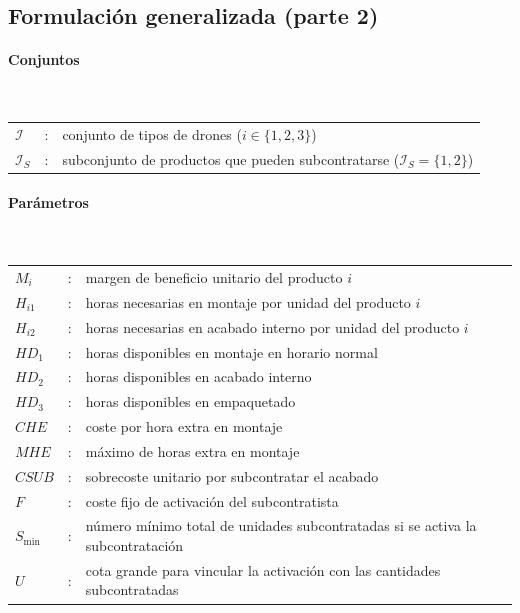 \subsection{Formulación generalizada (parte 2)}

\paragraph{Conjuntos}\mbox{}\\
\begin{tabular}{lcl}
$\mathcal{I}$ & : & conjunto de tipos de drones ($i \in \{1,2,3\}$) \\
$\mathcal{I}_S$ & : & subconjunto de productos que pueden subcontratarse ($\mathcal{I}_S = \{1,2\}$) \\
\end{tabular}

\paragraph{Parámetros}\mbox{}\\
\begin{tabular}{lcl}
$M_i$     & : & margen de beneficio unitario del producto $i$ \\
$H_{i1}$  & : & horas necesarias en montaje por unidad del producto $i$ \\
$H_{i2}$  & : & horas necesarias en acabado interno por unidad del producto $i$ \\
$HD_1$    & : & horas disponibles en montaje en horario normal \\
$HD_2$    & : & horas disponibles en acabado interno \\
$HD_3$    & : & horas disponibles en empaquetado \\
$CHE$     & : & coste por hora extra en montaje \\
$MHE$     & : & máximo de horas extra en montaje \\
$CSUB$    & : & sobrecoste unitario por subcontratar el acabado \\
$F$       & : & coste fijo de activación del subcontratista \\
$S_{\min}$& : & número mínimo total de unidades subcontratadas si se activa la subcontratación \\
$U$       & : & cota grande para vincular la activación con las cantidades subcontratadas \\
\end{tabular}

